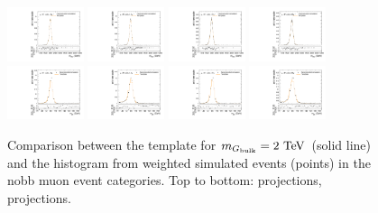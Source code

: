 \begin{figure}[htpb]
  \centering
  \includegraphics[width=0.2\textwidth]{fig/2Dfit/templateVsReco_GbuToWW2000_r0_MVV_mu_HP_nobb_LDy_linear.pdf}
  \includegraphics[width=0.2\textwidth]{fig/2Dfit/templateVsReco_GbuToWW2000_r0_MVV_mu_LP_nobb_LDy_linear.pdf}
  \includegraphics[width=0.2\textwidth]{fig/2Dfit/templateVsReco_GbuToWW2000_r0_MVV_mu_HP_nobb_HDy_linear.pdf}
  \includegraphics[width=0.2\textwidth]{fig/2Dfit/templateVsReco_GbuToWW2000_r0_MVV_mu_LP_nobb_HDy_linear.pdf}\\
  \includegraphics[width=0.2\textwidth]{fig/2Dfit/templateVsReco_GbuToWW2000_r0_MJ_mu_HP_nobb_LDy.pdf}
  \includegraphics[width=0.2\textwidth]{fig/2Dfit/templateVsReco_GbuToWW2000_r0_MJ_mu_LP_nobb_LDy.pdf}
  \includegraphics[width=0.2\textwidth]{fig/2Dfit/templateVsReco_GbuToWW2000_r0_MJ_mu_HP_nobb_HDy.pdf}
  \includegraphics[width=0.2\textwidth]{fig/2Dfit/templateVsReco_GbuToWW2000_r0_MJ_mu_LP_nobb_HDy.pdf}\\
  \caption{
    Comparison between the \ggF\GBulktoWW template for $m_{\GBulk}=2\unit{TeV}$ (solid line) and the histogram from weighted simulated events (points) in the nobb muon event categories.
    Top to bottom: \MVV projections, \MJ projections.
  }
  \label{fig:1dtemplateVsReco_GbuToWW2000_Run2}
\end{figure}

